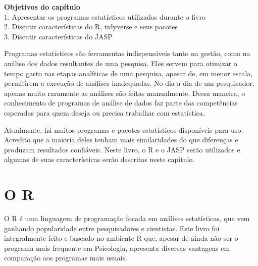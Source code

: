 \documentclass[
]{book}
\begin{document}
\begin{objectives}
\textbf{Objetivos do capítulo}\\
1. Apresentar os programas estatísticos utilizados durante o livro\\
2. Discutir características do R, tidyverse e seus pacotes\\
3. Discutir características do JASP
\end{objectives}

Programas estatísticos são ferramentas indispensáveis tanto na gestão,
como na análise dos dados resultantes de uma pesquisa. Eles servem para
otimizar o tempo gasto nas etapas analíticas de uma pesquisa, apesar de,
em menor escala, permitirem a execução de análises inadequadas. No dia a
dia de um pesquisador, apenas muito raramente as análises são feitas
manualmente. Dessa maneira, o conhecimento de programas de análise de
dados faz parte das competências esperadas para quem deseja ou precisa
trabalhar com estatística.

Atualmente, há muitos programas e pacotes estatísticos disponíveis para
uso. Acredito que a maioria deles tenham mais similaridades do que
diferenças e produzam resultados confiáveis. Neste livro, o R e o JASP
serão utilizados e algumas de suas características serão descritas neste
capítulo.

\hypertarget{o-r}{%
\section{O R}\label{o-r}}

O R é uma linguagem de programação focada em análises estatísticas, que
vem ganhando popularidade entre pesquisadores e cientistas. Este livro
foi integralmente feito e baseado no ambiente R que, apesar de ainda não
ser o programa mais frequente em Psicologia, apresenta diversas
vantagens em comparação aos programas mais usuais.
\end{document}

